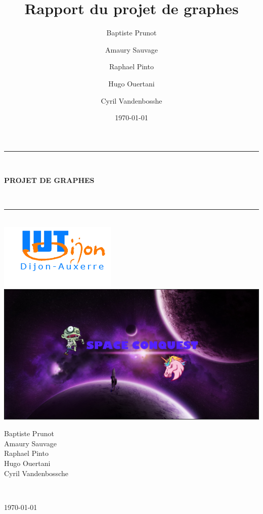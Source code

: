 \documentclass{report}
\title{\Huge{Rapport du projet de graphes}}
\author{Baptiste Prunot
\and Amaury Sauvage
\and Raphael Pinto
\and Hugo Ouertani
\and Cyril Vandenbosshe}
\date{\today}
\begin{document}
	\begin{titlepage}
	
		\begin{center}
			
			\hrule\\[1cm]
			\begin{Huge}
				\textbf{PROJET DE GRAPHES}
			\end{Huge}\\[1cm]
			\hrule\\[1cm]
			
			\includegraphics[scale=0.5]{Images/iut.png}\\[1cm]
			
			\includegraphics[scale=0.30]{Images/fondMenu.png}\\[2cm]
			\begin{center}
			\begin{Large}
				Baptiste Prunot\\
				Amaury Sauvage\\
				Raphael Pinto\\
				Hugo Ouertani\\
				Cyril Vandenbossche\\
				\end{Large}\\[2cm]
				
				
					\begin{flushright}
					\today
					\end{flushright}
					
				
				
				
			
			\end{center}
		\end{center}
		
	\end{titlepage}	
	
\end{document}
